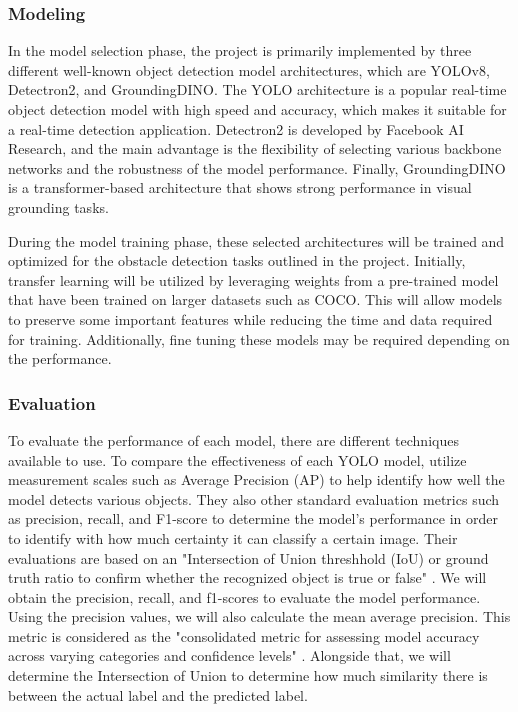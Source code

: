 \documentclass[stu,12pt,floatsintext]{apa7}
\begin{document}

\subsubsection{Modeling}

In the model selection phase, the project is primarily implemented by three different well-known object detection model architectures, which are YOLOv8, Detectron2, and GroundingDINO. The YOLO architecture is a popular real-time object detection model with high speed and accuracy, which makes it suitable for a real-time detection application. Detectron2 is developed by Facebook AI Research, and the main advantage is the flexibility of selecting various backbone networks and the robustness of the model performance. Finally, GroundingDINO is a transformer-based architecture that shows strong performance in visual grounding tasks. 

During the model training phase, these selected architectures will be trained and optimized for the obstacle detection tasks outlined in the project. Initially, transfer learning will be utilized by leveraging weights from a pre-trained model that have been trained on larger datasets such as COCO. This will allow models to preserve some important features while reducing the time and data required for training. Additionally, fine tuning these models may be required depending on the performance.



\subsubsection{Evaluation}
To evaluate the performance of each model, there are different techniques available to use. To compare the effectiveness of each YOLO model, \textcite{quach_evaluating_2023} utilize measurement scales such as Average Precision (AP) to help identify how well the model detects various objects. They also other standard evaluation metrics such as precision, recall, and F1-score to determine the model's performance in order to identify with how much certainty it can classify a certain image. Their evaluations are based on an "Intersection of Union threshhold (IoU) or ground truth ratio to confirm whether the recognized object is true or false" \parencite{quach_evaluating_2023}. We will obtain the precision, recall, and f1-scores to evaluate the model performance. Using the precision values, we will also calculate the mean average precision. This metric is considered as the "consolidated metric for assessing model accuracy across varying categories and confidence levels" \parencite{safaldin_improved_2024}. Alongside that, we will determine the Intersection of Union to determine how much similarity there is between the actual label and the predicted label. 
\end{document}
